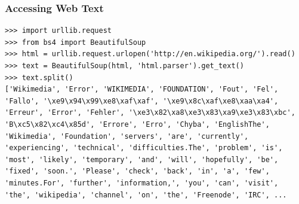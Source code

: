 \begin{frame}[fragile]\frametitle{Accessing Web Text}


\begin{lstlisting}
>>> import urllib.request
>>> from bs4 import BeautifulSoup
>>> html = urllib.request.urlopen('http://en.wikipedia.org/').read()
>>> text = BeautifulSoup(html, 'html.parser').get_text()
>>> text.split()
['Wikimedia', 'Error', 'WIKIMEDIA', 'FOUNDATION', 'Fout', 'Fel',
'Fallo', '\xe9\x94\x99\xe8\xaf\xaf', '\xe9\x8c\xaf\xe8\xaa\xa4',
'Erreur', 'Error', 'Fehler', '\xe3\x82\xa8\xe3\x83\xa9\xe3\x83\xbc',
'B\xc5\x82\xc4\x85d', 'Errore', 'Erro', 'Chyba', 'EnglishThe',
'Wikimedia', 'Foundation', 'servers', 'are', 'currently',
'experiencing', 'technical', 'difficulties.The', 'problem', 'is',
'most', 'likely', 'temporary', 'and', 'will', 'hopefully', 'be',
'fixed', 'soon.', 'Please', 'check', 'back', 'in', 'a', 'few',
'minutes.For', 'further', 'information,', 'you', 'can', 'visit',
'the', 'wikipedia', 'channel', 'on', 'the', 'Freenode', 'IRC', ...
\end{lstlisting}
\end{frame}






%
%
%
%

